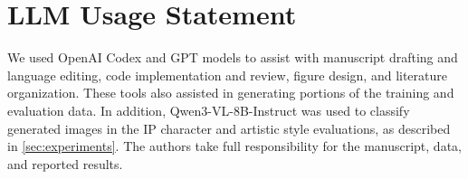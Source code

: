 \documentclass[10pt,twocolumn,letterpaper]{article}
\begin{document}
\clearpage
\section*{LLM Usage Statement}
We used OpenAI Codex and GPT models to assist with manuscript drafting and language editing, code implementation and review, figure design, and literature organization.
These tools also assisted in generating portions of the training and evaluation data.
In addition, Qwen3-VL-8B-Instruct was used to classify generated images in the IP character and artistic style evaluations, as described in \cref{sec:experiments}.
The authors take full responsibility for the manuscript, data, and reported results.

% 
% 
{
    \small
    
    
}


\end{document}
